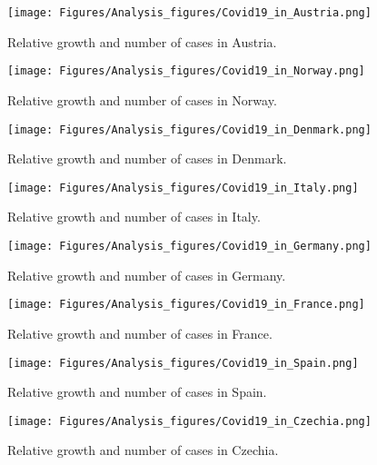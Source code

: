 \begin{figure}
    \centering
    \texttt{[image: Figures/Analysis\_figures/Covid19\_in\_Austria.png]}
    \caption{Relative growth and number of cases in Austria.}\label{fig:Austria}
\end{figure}

\begin{figure}
    \centering
    \texttt{[image: Figures/Analysis\_figures/Covid19\_in\_Norway.png]}
    \caption{Relative growth and number of cases in Norway.}\label{fig:Norway}
\end{figure}

\begin{figure}
    \centering
    \texttt{[image: Figures/Analysis\_figures/Covid19\_in\_Denmark.png]}
    \caption{Relative growth and number of cases in Denmark.}\label{fig:Denmark}
\end{figure}
\begin{figure}
    \centering
    \texttt{[image: Figures/Analysis\_figures/Covid19\_in\_Italy.png]}
    \caption{Relative growth and number of cases in Italy.}\label{fig:Italy}
\end{figure}

\begin{figure}
    \centering
    \texttt{[image: Figures/Analysis\_figures/Covid19\_in\_Germany.png]}
    \caption{Relative growth and number of cases in Germany.}\label{fig:Germany}
\end{figure}

\begin{figure}
    \centering
    \texttt{[image: Figures/Analysis\_figures/Covid19\_in\_France.png]}
    \caption{Relative growth and number of cases in France.}\label{fig:France}
\end{figure}

\begin{figure}
    \centering
    \texttt{[image: Figures/Analysis\_figures/Covid19\_in\_Spain.png]}
    \caption{Relative growth and number of cases in Spain.}\label{fig:Spain}
\end{figure}

\begin{figure}
    \centering
    \texttt{[image: Figures/Analysis\_figures/Covid19\_in\_Czechia.png]}
    \caption{Relative growth and number of cases in Czechia.}\label{fig:Czechia}
\end{figure}


